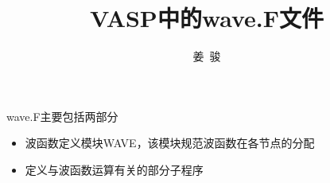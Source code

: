 
\title{\rm{VASP}中的\rm{wave.F}文件}
\author[ ]{姜~骏}   %
\renewcommand*{\Authfont}{\small\rm} %
\renewcommand*{\Affilfont}{\small\it} %
\renewcommand\Authands{ and } %
\renewcommand\Authands{ , } %
\date{} %


\maketitle
\textrm{wave.F}主要包括两部分
\begin{itemize}
	\item 波函数定义模块\textrm{WAVE}，该模块规范波函数在各节点的分配
	\item 定义与波函数运算有关的部分子程序
\end{itemize}

